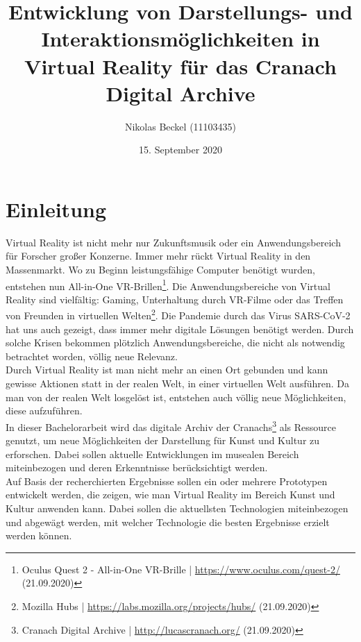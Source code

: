 \documentclass[a4paper,12pt,oneside]{article}
\title{Entwicklung von Darstellungs- und Interaktionsmöglichkeiten in Virtual Reality für das Cranach Digital Archive}
\author{Nikolas Beckel (11103435)}
\date{15. September 2020}
\begin{document}
  \tableofcontents
  \newpage
  \section{Einleitung}
      
    Virtual Reality ist nicht mehr nur Zukunftsmusik oder ein Anwendungsbereich für Forscher
    großer Konzerne. Immer mehr rückt Virtual Reality in den Massenmarkt. Wo zu Beginn
    leistungsfähige Computer benötigt wurden, entstehen nun All-in-One VR-Brillen\footnote{Oculus Quest 2 - All-in-One VR-Brille | \url{https://www.oculus.com/quest-2/} (21.09.2020)}.
    Die Anwendungsbereiche von Virtual Reality sind vielfältig: Gaming, Unterhaltung durch VR-Filme oder
    das Treffen von Freunden in virtuellen Welten\footnote{Mozilla Hubs | \url{https://labs.mozilla.org/projects/hubs/} (21.09.2020)}.
    Die Pandemie durch das Virus SARS-CoV-2 hat uns auch gezeigt, dass immer mehr digitale Lösungen
    benötigt werden. Durch solche Krisen bekommen plötzlich Anwendungsbereiche, die nicht als
    notwendig betrachtet worden, völlig neue Relevanz.\\
    Durch Virtual Reality ist man nicht mehr an einen Ort gebunden und kann gewisse Aktionen
    statt in der realen Welt, in einer virtuellen Welt ausführen. Da man von der realen Welt
    losgelöst ist, entstehen auch völlig neue Möglichkeiten, diese aufzuführen.\\
    In dieser Bachelorarbeit wird das digitale Archiv der Cranachs\footnote{Cranach Digital Archive | \url{http://lucascranach.org/} (21.09.2020)}
    als Ressource genutzt, um neue Möglichkeiten der Darstellung für Kunst und Kultur zu erforschen.
    Dabei sollen aktuelle Entwicklungen im musealen Bereich miteinbezogen und deren Erkenntnisse
    berücksichtigt werden.\\
    Auf Basis der recherchierten Ergebnisse sollen ein oder mehrere Prototypen entwickelt werden,
    die zeigen, wie man Virtual Reality im Bereich Kunst und Kultur anwenden kann. Dabei sollen die
    aktuellsten Technologien miteinbezogen und abgewägt werden, mit welcher Technologie die
    besten Ergebnisse erzielt werden können.
\end{document}
